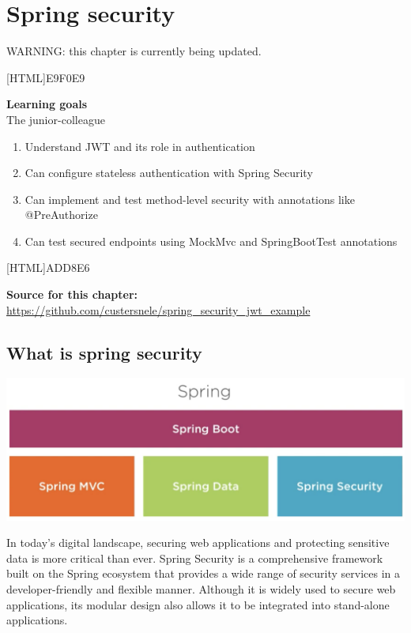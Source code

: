 \chapter{Spring security}

WARNING: this chapter is currently being updated.

[HTML]{E9F0E9}{\parbox{\textwidth}{%
\noindent \textbf{Learning goals}\\
The junior-colleague
\begin{enumerate}[nolistsep]
\item Understand JWT and its role in authentication
\item Can configure stateless authentication with Spring Security
\item Can implement and test method-level security with annotations like @PreAuthorize
\item Can test secured endpoints using MockMvc and SpringBootTest annotations
\end{enumerate}
}}

[HTML]{ADD8E6}{\parbox{\textwidth}{%
\noindent \textbf{Source for this chapter:}\\
\url{https://github.com/custersnele/spring_security_jwt_example}
}}


\section{What is spring security}

\includegraphics[width=\textwidth]{./images/security/spring_boot.png}

In today’s digital landscape, securing web applications and protecting sensitive data is more critical than ever. Spring Security is a comprehensive framework built on the Spring ecosystem that provides a wide range of security services in a developer-friendly and flexible manner. Although it is widely used to secure web applications, its modular design also allows it to be integrated into stand-alone applications.

